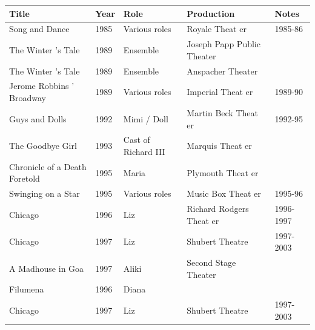 \documentclass{article}
\begin{document}
\begin{tabular}{lllll}
\toprule
Title & Year & Role & Production & Notes \\
\midrule
Song and Dance & 1985 & Various roles & Royale Theat er & 1985-86 \\
The Winter 's Tale & 1989 & Ensemble & Joseph Papp Public Theater &  \\
The Winter 's Tale & 1989 & Ensemble & Anspacher Theater &  \\
Jerome Robbins ' Broadway & 1989 & Various roles & Imperial Theat er & 1989-90 \\
Guys and Dolls & 1992 & Mimi / Doll & Martin Beck Theat er & 1992-95 \\
The Goodbye Girl & 1993 & Cast of Richard III & Marquis Theat er &  \\
Chronicle of a Death Foretold & 1995 & Maria & Plymouth Theat er &  \\
Swinging on a Star & 1995 & Various roles & Music Box Theat er & 1995-96 \\
Chicago & 1996 & Liz & Richard Rodgers Theat er & 1996-1997 \\
Chicago & 1997 & Liz & Shubert Theatre & 1997-2003 \\
A Madhouse in Goa & 1997 & Aliki & Second Stage Theater &  \\
Filumena & 1996 & Diana &  &  \\
Chicago & 1997 & Liz & Shubert Theatre & 1997-2003 \\
\bottomrule
\end{tabular}
\end{document}
